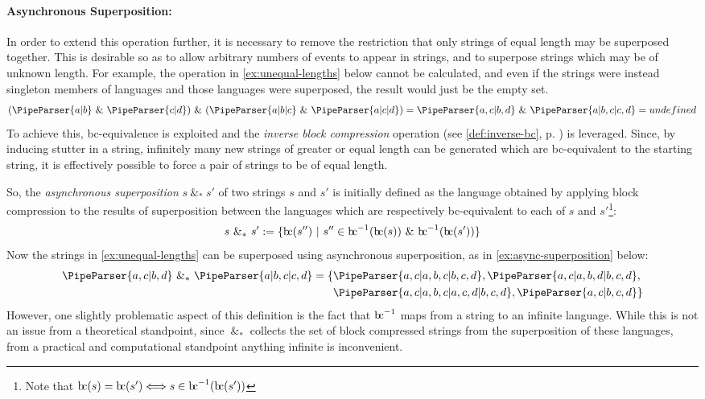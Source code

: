 \documentclass[a4paper,12pt,leqno,twoside]{article}
\newcommand{\bc}{{\rm b\!c}}
\newcommand{\vph}[1]{\vphantom{#1}}
\newcommand{\ebox}[1]{\fbox{$\vph{'(),}#1$}}
\renewcommand{\sp}{~\&~}
\newcommand{\spasync}{~\&_*~}
\newcommand{\EventString}[1]{%
	\renewcommand*{\do}[1]{\ebox{##1}}%
	\PipeParser{#1}%
}
\begin{document}
\paragraph{Asynchronous Superposition:}\label{para:str-op-sp-async}
In order to extend this operation further, it is necessary to remove the restriction that only strings of equal length may be superposed together. This is desirable so as to allow arbitrary numbers of events to appear in strings, and to superpose strings which may be of unknown length. For example, the operation in \cref{ex:unequal-lengths} below cannot be calculated, and even if the strings were instead singleton members of languages and those languages were superposed, the result would just be the empty set.
\begin{align}\label{ex:unequal-lengths}
	(\EventString{a|b} \sp \EventString{c|d}) \sp (\EventString{a|b|c} \sp \EventString{a|c|d})
	= \EventString{a,c|b,d} \sp \EventString{a|b,c|c,d}
	= undefined
\end{align}
To achieve this, \bc-equivalence is exploited and the \textit{inverse block compression} operation (see \cref{def:inverse-bc}, p. \pageref{def:inverse-bc}) is leveraged. Since, by inducing stutter in a string, infinitely many new strings of greater or equal length can be generated which are \bc-equivalent to the starting string, it is effectively possible to force a pair of strings to be of equal length.

So, the \textit{asynchronous superposition} $s \spasync s'$ of two strings $s$ and $s'$ is initially defined as the language obtained by applying block compression to the results of superposition between the languages which are respectively \bc-equivalent to each of $s$ and $s'$\footnote{Note that $\bc(s) = \bc(s') \Longleftrightarrow s \in \bc^{-1}(\bc(s'))$}:
\begin{align}\label{def:initial-async-superposition}
	s \spasync s' := \{\bc(s'') ~|~ s'' \in \bc^{-1}(\bc(s)) \sp \bc^{-1}(\bc(s'))\}
\end{align}
Now the strings in \cref{ex:unequal-lengths} can be superposed using asynchronous superposition, as in \cref{ex:async-superposition} below:
\begin{align}\label{ex:async-superposition}
	\EventString{a,c|b,d} \spasync \EventString{a|b,c|c,d} = \{&\EventString{a,c|a,b,c|b,c,d}, \EventString{a,c|a,b,d|b,c,d},\\&\EventString{a,c|a,b,c|a,c,d|b,c,d}, \EventString{a,c|b,c,d}\}\notag
\end{align}
However, one slightly problematic aspect of this definition is the fact that $\bc^{-1}$ maps from a string to an infinite language. While this is not an issue from a theoretical standpoint, since $\spasync$ collects the set of block compressed strings from the superposition of these languages, from a practical and computational standpoint anything infinite is inconvenient.
\end{document}
